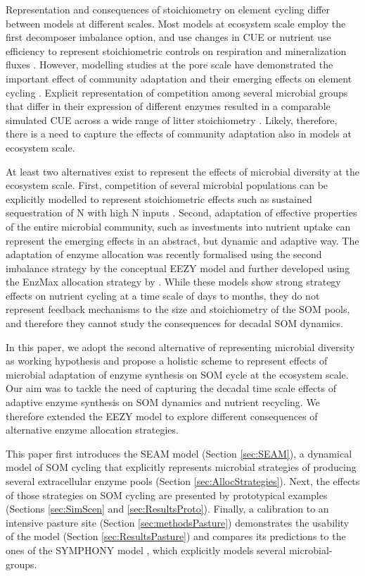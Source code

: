 Representation and consequences of stoichiometry on element cycling differ
between models at different scales. Most models at ecosystem scale employ the
first decomposer imbalance option, and use changes in CUE or nutrient use
efficiency to represent stoichiometric controls on respiration and mineralization fluxes
\citep{Manzoni08}. However, modelling studies at the pore scale have
demonstrated the important effect of community adaptation and their emerging
effects on element cycling \citep{Allison05, Resat11, Wang13}. Explicit
representation of competition among several microbial groups that differ in
their expression of different enzymes resulted in a comparable simulated CUE
across a wide range of litter stoichiometry \citep{Kaiser14}. Likely, therefore,
there is a need to capture the effects of community adaptation also in models at
ecosystem scale.

At least two alternatives exist to represent the effects of microbial diversity
at the ecosystem scale. First, competition of several microbial populations can
be explicitly modelled to represent stoichiometric effects such as sustained
sequestration of N with high N inputs \citep{Perveen14}. Second, adaptation of
effective properties of the entire microbial community, such as investments into
nutrient uptake \citep{Rastetter97, Rastetter11} can represent the emerging
effects in an abstract, but dynamic and adaptive way. The adaptation of enzyme
allocation was recently formalised using the second imbalance strategy by the
conceptual EEZY model \citep{Moorhead12} and further developed using the EnzMax
allocation strategy by \citet{Averill14}.
While these models show strong strategy effects on nutrient cycling at a time
scale of days to months, they do not represent feedback mechanisms to the size
and stoichiometry of the SOM pools, and therefore they cannot study the
consequences for decadal SOM dynamics.

In this paper, we adopt the second alternative of representing microbial
diversity as working hypothesis and propose a holistic scheme to represent
effects of microbial adaptation of enzyme synthesis on SOM cycle at the
ecosystem scale. Our aim was to tackle the need of capturing the decadal time
scale effects of adaptive enzyme synthesis on SOM dynamics and nutrient
recycling. We therefore extended the EEZY model to explore different
consequences of alternative enzyme allocation strategies.

This paper first introduces the SEAM model (Section \ref{sec:SEAM}), a dynamical
model of SOM cycling that explicitly represents microbial strategies of
producing several extracellular enzyme pools (Section
\ref{sec:AllocStrategies}). Next, the effects of those strategies on SOM cycling
are presented by prototypical examples (Sections \ref{sec:SimScen} and
\ref{sec:ResultsProto}).
Finally, a calibration to an intensive pasture site (Section
\ref{sec:methodsPasture}) demonstrates the usability of the model (Section
\ref{sec:ResultsPasture}) and compares its predictions to the ones of the
SYMPHONY model \citep{Perveen14}, which explicitly models several
microbial-groups. 


